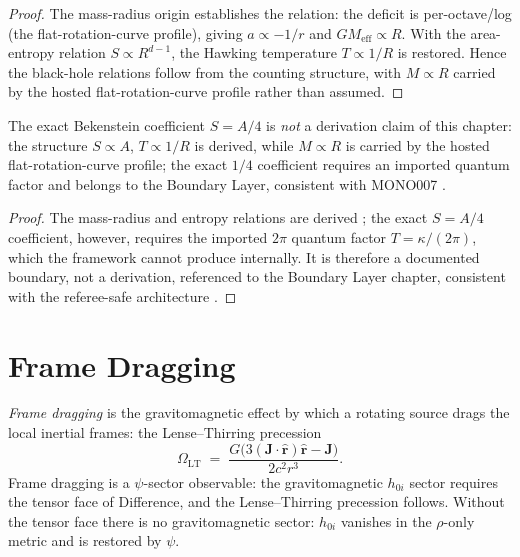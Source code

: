 \begin{proof}
The mass-radius origin \cite{c10:QG184} establishes the relation: the deficit is per-octave/log
(the flat-rotation-curve profile), giving $a \propto -1/r$ and
$GM_{\mathrm{eff}} \propto R$. With the area-entropy relation $S \propto R^{d-1}$, the
Hawking temperature $T \propto 1/R$ is restored. Hence the black-hole relations follow from the counting structure, with $M \propto R$
carried by the hosted flat-rotation-curve profile rather than assumed.
\end{proof}

\begin{theorem}
\label{c10:thm:bekenstein-boundary}
The exact Bekenstein coefficient $S = A/4$ is \emph{not} a derivation claim of this
chapter: the structure $S \propto A$, $T \propto 1/R$ is derived, while $M \propto R$ is carried by
the hosted flat-rotation-curve profile; the exact $1/4$ coefficient requires an imported
quantum factor and belongs to the Boundary
Layer, consistent with MONO007 \cite{c10:MONO007}.
\end{theorem}

\begin{proof}
The mass-radius and entropy relations are derived \cite{c10:QG184}; the exact $S = A/4$
coefficient, however, requires the imported $2\pi$ quantum factor $T = \kappa/(2\pi)$,
which the framework cannot produce internally. It is therefore a documented boundary, not
a derivation, referenced to the Boundary Layer chapter, consistent with the referee-safe
architecture \cite{c10:MONO007}.
\end{proof}

\section{Frame Dragging}
\label{c10:sec:frame-dragging}

\begin{theorem}
\label{c10:thm:frame-dragging}
\emph{Frame dragging} is the gravitomagnetic effect by which a rotating source drags the
local inertial frames: the Lense--Thirring precession
\begin{equation}
\label{c10:eq:frame-dragging}
\Omega_{\mathrm{LT}} \;=\; \frac{G\bigl(3(\mathbf{J}\cdot\hat{\mathbf{r}})\hat{\mathbf{r}}-\mathbf{J}\bigr)}{2c^2r^3}.
\end{equation}
Frame dragging is a $\psi$-sector observable: the gravitomagnetic $h_{0i}$ sector requires
the tensor face of Difference, and the Lense--Thirring precession follows. Without the
tensor face there is no gravitomagnetic sector: $h_{0i}$ vanishes in the $\rho$-only metric
and is restored by $\psi$.
\end{theorem}

